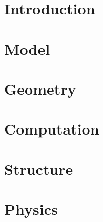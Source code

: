 \documentclass{article}
\begin{document}
\maketitle
\thispagestyle{plain}



\part{Introduction}






\part{Model}








\part{Geometry}











\part{Computation}






\part{Structure}







\part{Physics}










\end{document}

